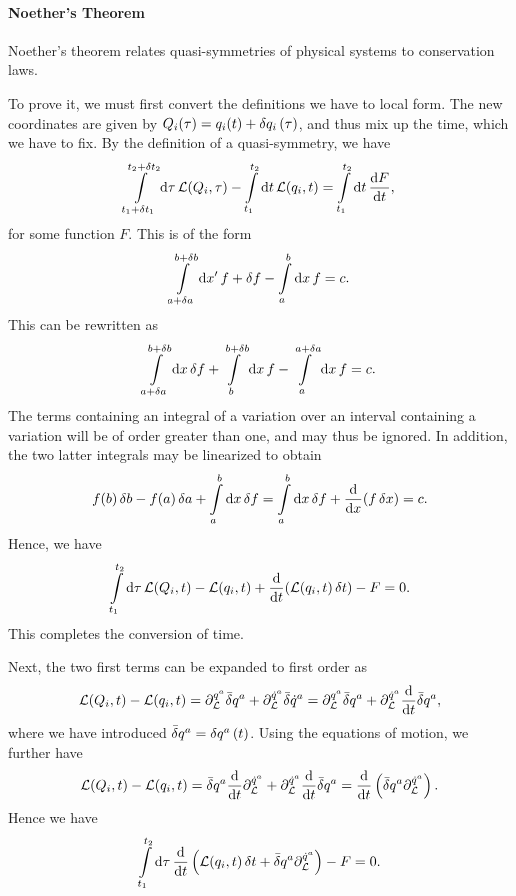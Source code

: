 \paragraph{Noether's Theorem}
Noether's theorem relates quasi-symmetries of physical systems to conservation laws.

To prove it, we must first convert the definitions we have to local form. The new coordinates are given by $Q_{i}(\tau) = q_{i}(t) + \var{q_{i}}(\tau)$, and thus mix up the time, which we have to fix. By the definition of a quasi-symmetry, we have
\begin{align*}
	\int\limits_{t_{1} + \var{t_{1}}}^{t_{2} + \var{t_{2}}}\dd{\tau}{\ensuremath{\mathcal{L}}(Q_{i}, \tau)} - \int\limits_{t_{1}}^{t_{2}}\dd{t}{\ensuremath{\mathcal{L}}(q_{i}, t)} = \int\limits_{t_{1}}^{t_{2}}\dd{t}{\dv{F}{t}},
\end{align*}
for some function $F$. This is of the form
\begin{align*}
	\int\limits_{a + \var{a}}^{b + \var{b}}\dd{x'}{f + \var{f}} - \int\limits_{a}^{b}\dd{x}{f} = c.
\end{align*}
This can be rewritten as
\begin{align*}
	\int\limits_{a + \var{a}}^{b + \var{b}}\dd{x}{\var{f}} + \int\limits_{b}^{b + \var{b}}\dd{x}{f} - \int\limits_{a}^{a + \var{a}}\dd{x}{f} = c.
\end{align*}
The terms containing an integral of a variation over an interval containing a variation will be of order greater than one, and may thus be ignored. In addition, the two latter integrals may be linearized to obtain
\begin{align*}
	f(b)\var{b} - f(a)\var{a} + \int\limits_{a}^{b}\dd{x}{\var{f}} = \int\limits_{a}^{b}\dd{x}{\var{f} + \dv{x}(f\var{x})} = c.
\end{align*}
Hence, we have
\begin{align*}
	\int\limits_{t_{1}}^{t_{2}}\dd{\tau}{\ensuremath{\mathcal{L}}(Q_{i}, t) - \ensuremath{\mathcal{L}}(q_{i}, t) + \dv{t}(\ensuremath{\mathcal{L}}(q_{i}, t)\var{t}) - F} = 0.
\end{align*}
This completes the conversion of time.

Next, the two first terms can be expanded to first order as
\begin{align*}
	\mathcal{L}(Q_{i}, t) - \mathcal{L}(q_{i}, t) = \partial^{q^{a}}_{\mathcal{L}}\bar{\delta}q^{a} + \partial^{\dot{q}^{a}}_{\mathcal{L}}\bar{\delta}\dot{q}^{a} = \partial^{q^{a}}_{\mathcal{L}}\bar{\delta}q^{a} + \partial^{\dot{q}^{a}}_{\mathcal{L}}\dv{t}\bar{\delta}q^{a},
\end{align*}
where we have introduced $\bar{\delta}q^{a} = \var{q^{a}}(t)$. Using the equations of motion, we further have
\begin{align*}
	\mathcal{L}(Q_{i}, t) - \mathcal{L}(q_{i}, t) = \bar{\delta}q^{a}\dv{t}\partial^{\dot{q}^{a}}_{\mathcal{L}} + \partial^{\dot{q}^{a}}_{\mathcal{L}}\dv{t}\bar{\delta}q^{a} = \dv{t}\left(\bar{\delta}q^{a}\partial^{\dot{q}^{a}}_{\mathcal{L}}\right).
\end{align*}
Hence we have
\begin{align*}
	\int\limits_{t_{1}}^{t_{2}}\dd{\tau}{\dv{t}\left(\ensuremath{\mathcal{L}}(q_{i}, t)\var{t} + \bar{\delta}q^{a}\ensuremath{\partial^{\dot{q}^{a}}_{\mathcal{L}}}\right) - F} = 0.
\end{align*}

